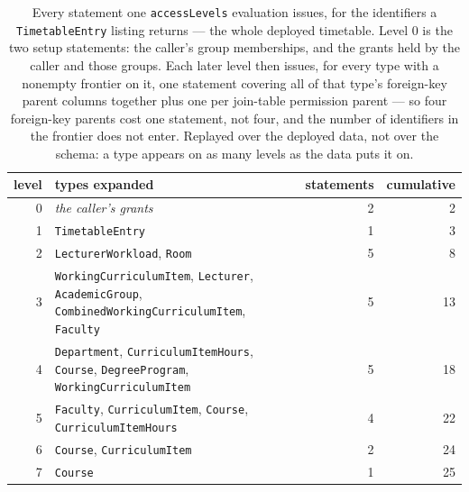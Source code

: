 \begin{table}[t]
\centering
\caption{Every statement one \lstinline|accessLevels| evaluation issues, for the identifiers a \texttt{TimetableEntry} listing returns --- the whole deployed timetable. Level $0$ is the two setup statements: the caller's group memberships, and the grants held by the caller and those groups. Each later level then issues, for every type with a nonempty frontier on it, one statement covering all of that type's foreign-key parent columns together plus one per join-table permission parent --- so four foreign-key parents cost one statement, not four, and the number of identifiers in the frontier does not enter. Replayed over the deployed data, not over the schema: a type appears on as many levels as the data puts it on.}
\label{tab:trace}
\small
\begin{tabular}{@{}r>{\raggedright\arraybackslash}p{}rr@{}}
\toprule
level & types expanded & statements & cumulative \\
\midrule
0 & \emph{the caller's grants} & 2 & 2 \\
1 & \texttt{Timetable\-Entry} & 1 & 3 \\
2 & \texttt{Lecturer\-Workload}, \texttt{Room} & 5 & 8 \\
3 & \texttt{Working\-Curriculum\-Item}, \texttt{Lecturer}, \texttt{Academic\-Group}, \texttt{Combined\-Working\-Curriculum\-Item}, \texttt{Faculty} & 5 & 13 \\
4 & \texttt{Department}, \texttt{Curriculum\-Item\-Hours}, \texttt{Course}, \texttt{Degree\-Program}, \texttt{Working\-Curriculum\-Item} & 5 & 18 \\
5 & \texttt{Faculty}, \texttt{Curriculum\-Item}, \texttt{Course}, \texttt{Curriculum\-Item\-Hours} & 4 & 22 \\
6 & \texttt{Course}, \texttt{Curriculum\-Item} & 2 & 24 \\
7 & \texttt{Course} & 1 & 25 \\
\bottomrule
\end{tabular}
\end{table}
